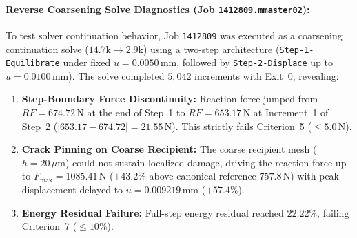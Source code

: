\begin{enumerate}
\paragraph{Reverse Coarsening Solve Diagnostics (Job \texttt{1412809.mmaster02}):}
To test solver continuation behavior, Job \texttt{1412809} was executed as a coarsening continuation solve ($14.7\mathrm{k} \to 2.9\mathrm{k}$) using a two-step architecture (\texttt{Step-1-Equilibrate} under fixed $u=0.0050\,\mathrm{mm}$, followed by \texttt{Step-2-Displace} up to $u=0.0100\,\mathrm{mm}$). The solve completed $5{,}042$ increments with Exit~0, revealing:
\begin{enumerate}
  \item \textbf{Step-Boundary Force Discontinuity:} Reaction force jumped from $RF = 674.72\,\mathrm{N}$ at the end of Step~1 to $RF = 653.17\,\mathrm{N}$ at Increment~1 of Step~2 ($|653.17 - 674.72| = 21.55\,\mathrm{N}$). This strictly fails Criterion~5 ($\le 5.0\,\mathrm{N}$).
  \item \textbf{Crack Pinning on Coarse Recipient:} The coarse recipient mesh ($h = 20\,\mu\mathrm{m}$) could not sustain localized damage, driving the reaction force up to $F_{\max} = 1085.41\,\mathrm{N}$ ($+43.2\%$ above canonical reference $757.8\,\mathrm{N}$) with peak displacement delayed to $u = 0.009219\,\mathrm{mm}$ ($+57.4\%$).
  \item \textbf{Energy Residual Failure:} Full-step energy residual reached $22.22\%$, failing Criterion~7 ($\le 10\%$).
\end{enumerate}


\end{enumerate}
